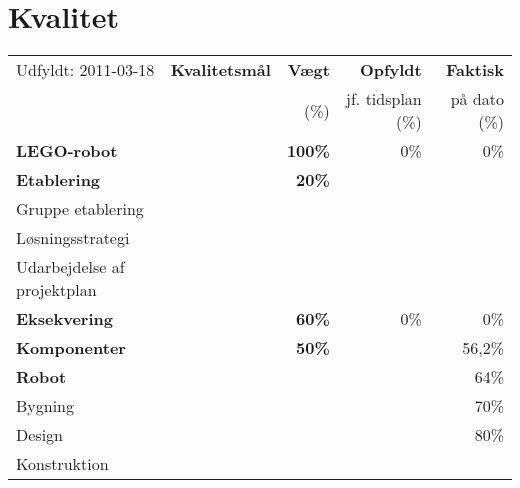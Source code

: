 \section{Kvalitet}
\begin{footnotesize}
\begin{center}
\begin{tabular}{l | l | r r r}
	\footnotesize{Udfyldt: 2011-03-18}	& \textbf{Kvalitetsmål} & \textbf{Vægt} & \textbf{Opfyldt} & \textbf{Faktisk}\\
	& & \footnotesize{(\%)}	& \footnotesize{jf. tidsplan (\%)}	& \footnotesize{på dato (\%)} \\
	\hline
	\textbf{LEGO-robot}
																&		& \textbf{100\%} & 0\% & 0\% \\
	\hline
	\hline
	\textbf{Etablering}
																&		& \textbf{20\%} 	& 		& \\
	\hspace*{0.3cm} Gruppe etablering
					 											&		&		&		& \\
	\hspace*{0.3cm} Løsningsstrategi
					 											&		&		&		& \\
	\hspace*{0.3cm} Udarbejdelse af projektplan 
																&		&		&		& \\
	\hline
	\textbf{Eksekvering}
																&		& \textbf{60\%}	& 0\% & 0\% \\		
	\hspace*{0.3cm}\textbf{Komponenter}
																&		& \textbf{50\%}		& 		& 56,2\%\\
	\hspace*{0.3cm}\hspace*{0.3cm} \textbf{Robot}
																& 		&    	& 		& 64\% \\
	\hspace*{0.3cm}\hspace*{0.3cm}\hspace*{0.3cm} Bygning
																& 		&		& 		& 70\%\\
	\hspace*{0.3cm}\hspace*{0.3cm}\hspace*{0.3cm}\hspace*{0.3cm} Design
																&		&		& 		& 80\%\\
	\hspace*{0.3cm}\hspace*{0.3cm}\hspace*{0.3cm}\hspace*{0.3cm} Konstruktion

\end{tabular}
\end{center}
\end{footnotesize}
